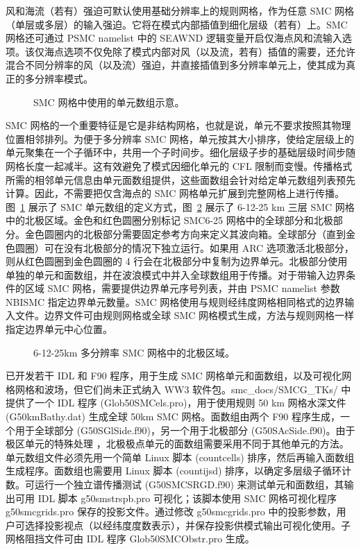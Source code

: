 风和海流（若有）强迫可默认使用基础分辨率上的规则网格，作为任意 SMC 网格（单层或多层）的输入强迫。它将在模式内部插值到细化层级（若有）上。SMC 网格还可通过 {\F PSMC} namelist 中的 {\code SEAWND} 逻辑变量开启仅海点风和流输入选项。该仅海点选项不仅免除了模式内部对风（以及流，若有）插值的需要，还允许混合不同分辨率的风（以及流）强迫，并直接插值到多分辨率单元上，使其成为真正的多分辨率模式。

\begin{figure}
\centerline{}
\caption{SMC 网格中使用的单元数组示意。}
\label{fig:SMCells} \botline
\end{figure}

SMC 网格的一个重要特征是它是非结构网格，也就是说，单元不要求按照其物理位置相邻排列。为便于多分辨率 SMC 网格，单元按其大小排序，使给定层级上的单元聚集在一个子循环中，共用一个子时间步。细化层级子步的基础层级时间步随网格长度一起减半。这有效避免了模式因细化单元的 CFL 限制而变慢。传播格式所需的相邻单元信息由单元面数组提供，这些面数组会针对给定单元数组列表预先计算。因此，不需要把仅含海点的 SMC 网格单元扩展到完整网格上进行传播。图~\ref{fig:SMCells} 展示了 SMC 单元数组的定义方式，图~\ref{fig:SMC_Arctic} 展示了 6-12-25 km 三层 SMC 网格中的北极区域。金色和红色圆圈分别标记 SMC6-25 网格中的全球部分和北极部分。金色圆圈内的北极部分需要固定参考方向来定义其波向箱。全球部分（直到金色圆圈）可在没有北极部分的情况下独立运行。如果用 ARC 选项激活北极部分，则从红色圆圈到金色圆圈的 4 行会在北极部分中复制为边界单元。北极部分使用单独的单元和面数组，并在波浪模式中并入全球数组用于传播。对于带输入边界条件的区域 SMC 网格，需要提供边界单元序号列表，并由 {\F PSMC} namelist 参数 {\code NBISMC} 指定边界单元数量。SMC 网格使用与规则经纬度网格相同格式的边界输入文件。边界文件可由规则网格或全球 SMC 网格模式生成，方法与规则网格一样指定边界单元中心位置。

\begin{figure}
\centerline{}
\caption{6-12-25km 多分辨率 SMC 网格中的北极区域。}
\label{fig:SMC_Arctic} 
\botline
\end{figure}

已开发若干 IDL 和 F90 程序，用于生成 SMC 网格单元和面数组，以及可视化网格网格和波场，但它们尚未正式纳入 WW3 软件包。smc\_docs/SMCG\_TKs/ 中提供了一个 IDL 程序 (Glob50SMCels.pro)，用于使用规则 50 km 网格水深文件 (G50kmBathy.dat) 生成全球 50km SMC 网格。面数组由两个 F90 程序生成，一个用于全球部分 (G50SGlSide.f90)，另一个用于北极部分 (G50SAcSide.f90)。由于极区单元的特殊处理 \citep{art:Li12}，北极极点单元的面数组需要采用不同于其他单元的方法。单元数组文件必须先用一个简单 Linux 脚本 (countcells) 排序，然后再输入面数组生成程序。面数组也需要用 Linux 脚本 (countijsd) 排序，以确定多层级子循环计数。可运行一个独立谱传播测试 (G50SMCSRGD.f90) 来测试单元和面数组，其输出可用 IDL 脚本 g50smstrspb.pro 可视化；该脚本使用 SMC 网格可视化程序 g50smcgrids.pro 保存的投影文件。通过修改 g50smcgrids.pro 中的投影参数，用户可选择投影视点（以经纬度度数表示），并保存投影供模式输出可视化使用。子网格阻挡文件可由 IDL 程序 Glob50SMCObstr.pro 生成。


